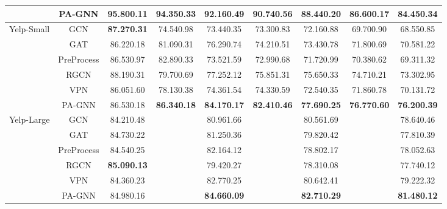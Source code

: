 \documentclass[sigconf]{acmart}
\newcommand{\our}{{PA-GNN}\xspace}
\begin{document}
\begin{table*}[!t]
\begin{tabular}{c|c|ccccccc}
                            & \our & 95.800.11 & 94.350.33 & \textbf{92.160.49} & \textbf{90.740.56} & \textbf{88.440.20} & \textbf{86.600.17} & \textbf{84.450.34} \\
                            \hline
\multirow{6}{*}{Yelp-Small} & GCN                  & \textbf{87.270.31} & 74.540.98 & 73.440.35 & 73.300.83 & 72.160.88 & 69.700.90 & 68.550.85 \\
                            & GAT                  & 86.220.18 & 81.090.31 & 76.290.74 & 74.210.51 & 73.430.78 & 71.800.69 & 70.581.22 \\
                            & PreProcess           & 86.530.97 & 82.890.33 & 73.521.59 & 72.990.68 & 71.720.99 & 70.380.62 & 69.311.32 \\
                            & RGCN                 & 88.190.31 & 79.700.69 & 77.252.12 & 75.851.31 & 75.650.33 & 74.710.21 & 73.302.95 \\
                            & VPN              & 86.051.60 & 78.130.38 & 74.361.54 & 74.330.59 & 72.540.35 & 71.860.78 & 70.131.72 \\
                            & \our & 86.530.18 & \textbf{86.340.18} & \textbf{84.170.17} & \textbf{82.410.46} & \textbf{77.690.25} & \textbf{76.770.60} & \textbf{76.200.39} \\
                            \hline
\multirow{6}{*}{Yelp-Large} & GCN                  & 84.210.48 &             & 80.961.66 &             & 80.561.69 &             & 78.640.46 \\
                            & GAT                  & 84.730.22 &             & 81.250.36 &             & 79.820.42 &             & 77.810.39 \\
                            & PreProcess           & 84.540.25 &             & 82.164.12 &             & 78.802.17 &             & 78.052.63 \\
                            & RGCN                 & \textbf{85.090.13} &             & 79.420.27 &             & 78.310.08 &             & 77.740.12 \\
                            & VPN              & 84.360.23 &             & 82.770.25 &             & 80.642.41 &             & 79.222.32 \\
                            & \our & 84.980.16 &             & \textbf{84.660.09} &             & \textbf{82.710.29} &             & \textbf{81.480.12} \\
                            \hline
\end{tabular}
\end{table*}
\end{document}
